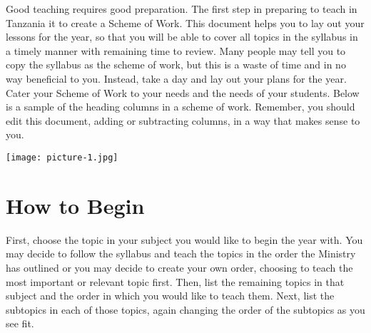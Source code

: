 Good teaching requires good preparation.  The first step in preparing to teach in Tanzania it to create a Scheme of Work. This document helps you to lay out your lessons for the year, so that you will be able to cover all topics in the syllabus in a timely manner with remaining time to review.  Many people may tell you to copy the syllabus as the scheme of work, but this is a waste of time and in no way beneficial to you.  Instead, take a day and lay out your plans for the year.   Cater your Scheme of Work to your needs and the needs of your students. Below is a sample of the heading columns in a scheme of work. Remember, you should edit this document, adding or subtracting columns, in a way that makes sense to you.

\begin{flushleft}
\texttt{[image: picture-1.jpg]} 
\end{flushleft}


\section{How to Begin}
First, choose the topic in your subject you would like to begin the year with.  You may decide to follow the syllabus and teach the topics in the order the Ministry has outlined or you may decide to create your own order, choosing to teach the most important or relevant topic first.  Then, list the remaining topics in that subject and the order in which you would like to teach them.  Next, list the subtopics in each of those topics, again changing the order of the subtopics as you see fit.\\

